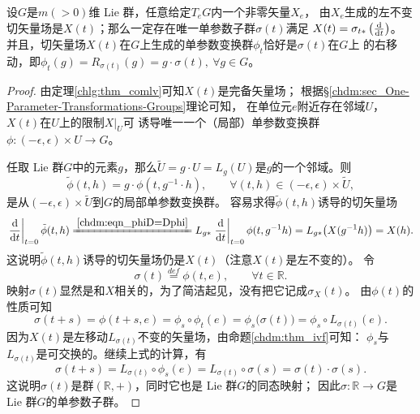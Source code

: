 

\begin{theorem}\label{chlg:thm_oglsv}
    设$G$是$m(>0)$维 Lie 群，任意给定$T_e G$内一个非零矢量$X_e$，
    由$X_e$生成的左不变切矢量场是$X(t)$；那么一定存在唯一单参数子群$\sigma(t)$满足
     $X(t)=\sigma_{t*}\left(\frac{{\rm d}}{{\rm d}t}\right)$。
    并且，切矢量场$X(t)$在$G$上生成的单参数变换群$\phi_t$恰好是$\sigma(t)$在$G$上
    的右移动，即$\phi_t(g)=R_{\sigma(t)}(g)=g\cdot \sigma(t),\ \forall g\in G$。
\end{theorem}
\begin{proof}
    由定理\ref{chlg:thm_comlv}可知$X(t)$是完备矢量场；
根据\S\ref{chdm:sec_One-Parameter-Transformations-Groups}理论可知，
在单位元$e$附近存在邻域$U$，$X(t)$在$U$上的限制$X|_U$可
诱导唯一一个（局部）单参数变换群$\phi:(-\epsilon,\epsilon)\times U\to G$。

任取 Lie 群$G$中的元素$g$，那么$\tilde{U}=g\cdot U=L_g(U)$是$g$的一个邻域。则
\begin{equation}
    \tilde{\phi}(t,h)=g\cdot \phi(t,g^{-1}\cdot h),\qquad
    \forall (t,h)\in (-\epsilon,\epsilon)\times \tilde{U},
\end{equation}
是从$(-\epsilon,\epsilon)\times \tilde{U}$到$G$的局部单参数变换群。
容易求得$\tilde{\phi}(t,h)$诱导的切矢量场
\begin{equation}
    \left. \frac{{\rm d}}{{\rm d}t}\right|_{t=0}\tilde{\phi}(t,h)
    \xlongequal{\ref{chdm:eqn_phiD=Dphi}}
    L_{g*}\left. \frac{{\rm d}}{{\rm d}t}\right|_{t=0} \phi(t,g^{-1}h)
    =L_{g*} \bigl(X(g^{-1}h)\bigr) = X(h).
\end{equation}
这说明$\tilde{\phi}(t,h)$诱导的切矢量场仍是$X(t)$（注意$X(t)$是左不变的）。
令
\begin{equation}\label{chlg:eqn_opsi}
    \sigma(t) \overset{def}{=} \phi(t,e),\qquad \forall t\in \mathbb{R}.
\end{equation}
映射$\sigma(t)$显然是和$X$相关的，为了简洁起见，没有把它记成$\sigma_X(t)$。
由$\phi(t)$的性质可知
\begin{equation}
    \sigma(t+s)=\phi(t+s,e)=\phi_s \circ \phi_t(e) = \phi_s\bigl(\sigma(t)\bigr)
    = \phi_s\circ L_{\sigma(t)}(e) .
\end{equation}
因为$X(t)$是左移动$L_{\sigma(t)}$不变的矢量场，由命题\ref{chdm:thm_ivf}可知：
$\phi_s$与$L_{\sigma(t)}$是可交换的。继续上式的计算，有
\begin{equation}
    \sigma(t+s)=L_{\sigma(t)} \circ  \phi_s (e) =L_{\sigma(t)} \circ \sigma(s)
    =\sigma(t) \cdot \sigma(s) .
\end{equation}
这说明$\sigma(t)$是群$(\mathbb{R},+)$，同时它也是 Lie 群$G$的同态映射；
因此$\sigma:\mathbb{R}\to G$是 Lie 群$G$的单参数子群。


\end{proof}
